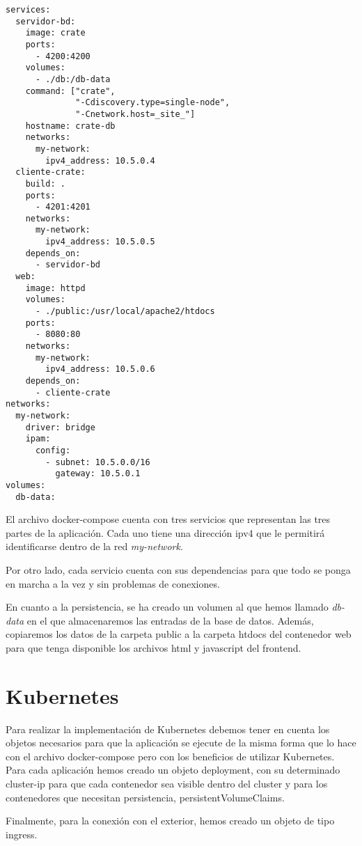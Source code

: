 \documentclass[12pt]{article}
\begin{document}
\begin{lstlisting}[caption={Archivo docker-compose.yml}, captionpos=b]
services:
  servidor-bd:
    image: crate
    ports:
      - 4200:4200
    volumes:
      - ./db:/db-data
    command: ["crate",
              "-Cdiscovery.type=single-node",
              "-Cnetwork.host=_site_"]
    hostname: crate-db
    networks:
      my-network:
        ipv4_address: 10.5.0.4
  cliente-crate:
    build: .
    ports:
      - 4201:4201
    networks:
      my-network:
        ipv4_address: 10.5.0.5
    depends_on:
      - servidor-bd
  web:
    image: httpd
    volumes:
      - ./public:/usr/local/apache2/htdocs
    ports:
      - 8080:80
    networks:
      my-network:
        ipv4_address: 10.5.0.6
    depends_on:
      - cliente-crate
networks:
  my-network:
    driver: bridge
    ipam:
      config:
        - subnet: 10.5.0.0/16
          gateway: 10.5.0.1
volumes:
  db-data:
\end{lstlisting}

El archivo docker-compose cuenta con tres servicios que representan las tres partes de
la aplicación. Cada uno tiene una dirección ipv4 que le permitirá identificarse dentro
de la red \emph{my-network}.

Por otro lado, cada servicio cuenta con sus dependencias para que todo se ponga en marcha
a la vez y sin problemas de conexiones.

En cuanto a la persistencia, se ha creado un volumen al que hemos llamado \emph{db-data} en
el que almacenaremos las entradas de la base de datos. Además, copiaremos los datos de la carpeta
public a la carpeta htdocs del contenedor web para que tenga disponible los archivos html
y javascript del frontend.

\section{Kubernetes}
Para realizar la implementación de Kubernetes debemos tener en cuenta los objetos necesarios
para que la aplicación se ejecute de la misma forma que lo hace con el archivo docker-compose
pero con los beneficios de utilizar Kubernetes. Para cada aplicación hemos creado un objeto
deployment, con su determinado cluster-ip para que cada contenedor sea visible dentro del cluster
y para los contenedores que necesitan persistencia, persistentVolumeClaims.

Finalmente, para la conexión con el exterior, hemos creado un objeto de tipo ingress.
\end{document}
